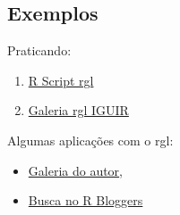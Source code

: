 
\subsection{Exemplos}

\begin{frame}

  Praticando:
  \begin{enumerate}
  \item \href{run:./R/rgl/rgl.R}{R Script rgl}
  \item \href{run:./rgl/RGL.html}{Galeria rgl IGUIR}
  \end{enumerate}

  \vspace{0.5cm}
  Algumas aplicações com o rgl:
  \begin{itemize}
  \item \href{http://cran.r-project.org/web/packages/rgl/vignettes/}{Galeria
      do autor},
  \item \href{http://www.r-bloggers.com/?s=rgl}{Busca no R Bloggers}
  \end{itemize}

\end{frame}
